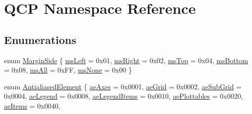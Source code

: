 \hypertarget{namespace_q_c_p}{}\section{Q\+CP Namespace Reference}
\label{namespace_q_c_p}
\subsection*{Enumerations}
\begin{DoxyCompactItemize}
\item 
enum \mbox{\hyperlink{namespace_q_c_p_a7e487e3e2ccb62ab7771065bab7cae54}{Margin\+Side}} \{ \newline
\mbox{\hyperlink{namespace_q_c_p_a7e487e3e2ccb62ab7771065bab7cae54a9500c8bfcc9e80b9dff0a8e00e867f07}{ms\+Left}} = 0x01, 
\mbox{\hyperlink{namespace_q_c_p_a7e487e3e2ccb62ab7771065bab7cae54a93c719593bb2b94ed244d52c86d83b65}{ms\+Right}} = 0x02, 
\mbox{\hyperlink{namespace_q_c_p_a7e487e3e2ccb62ab7771065bab7cae54a5db8fb0d0b0ecf0d611c2602a348e8a0}{ms\+Top}} = 0x04, 
\mbox{\hyperlink{namespace_q_c_p_a7e487e3e2ccb62ab7771065bab7cae54a5241d8eac2bab9524a38889f576179cc}{ms\+Bottom}} = 0x08, 
\newline
\mbox{\hyperlink{namespace_q_c_p_a7e487e3e2ccb62ab7771065bab7cae54a43d7361cb0c5244eabdc962021bffebc}{ms\+All}} = 0x\+FF, 
\mbox{\hyperlink{namespace_q_c_p_a7e487e3e2ccb62ab7771065bab7cae54a80aa4149f16dabd538f8b2e3d42c42d5}{ms\+None}} = 0x00
 \}
\item 
enum \mbox{\hyperlink{namespace_q_c_p_ae55dbe315d41fe80f29ba88100843a0c}{Antialiased\+Element}} \{ \newline
\mbox{\hyperlink{namespace_q_c_p_ae55dbe315d41fe80f29ba88100843a0caefa92e89cd37f8a081fd2075aa1af73f}{ae\+Axes}} = 0x0001, 
\mbox{\hyperlink{namespace_q_c_p_ae55dbe315d41fe80f29ba88100843a0ca4fbb37118d62288af0ca601ff2b07a2f}{ae\+Grid}} = 0x0002, 
\mbox{\hyperlink{namespace_q_c_p_ae55dbe315d41fe80f29ba88100843a0caaedf83369188a15a69f92bb1d85ca97b}{ae\+Sub\+Grid}} = 0x0004, 
\mbox{\hyperlink{namespace_q_c_p_ae55dbe315d41fe80f29ba88100843a0ca9e0127a6361b5d0596b031a482c5cf97}{ae\+Legend}} = 0x0008, 
\newline
\mbox{\hyperlink{namespace_q_c_p_ae55dbe315d41fe80f29ba88100843a0ca1aca7a50c1b95403958733a4acafe773}{ae\+Legend\+Items}} = 0x0010, 
\mbox{\hyperlink{namespace_q_c_p_ae55dbe315d41fe80f29ba88100843a0ca4145e4251b0cf2dbedabeea0a38f84f6}{ae\+Plottables}} = 0x0020, 
\mbox{\hyperlink{namespace_q_c_p_ae55dbe315d41fe80f29ba88100843a0caf7712a85d6b0c75b24301d2fe9484db3}{ae\+Items}} = 0x0040, 

\end{DoxyCompactItemize}
